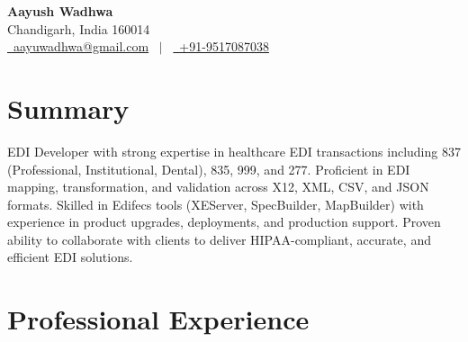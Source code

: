 \documentclass[a4paper,10pt]{article}
\begin{document}
\pagestyle{empty}

\begin{center}
    {\Huge \textbf{Aayush Wadhwa}} \\[4pt]
    Chandigarh, India 160014 \\
    \href{mailto:aayuwadhwa@gmail.com}{\faEnvelope\ aayuwadhwa@gmail.com} \, $|$ \,
    \href{tel:+919517087038}{\faMobile\ +91-9517087038} \\
\end{center}

\section{Summary}
EDI Developer with strong expertise in healthcare EDI transactions including 837 (Professional, Institutional, Dental), 835, 999, and 277. Proficient in EDI mapping, transformation, and validation across X12, XML, CSV, and JSON formats. Skilled in Edifecs tools (XEServer, SpecBuilder, MapBuilder) with experience in product upgrades, deployments, and production support. Proven ability to collaborate with clients to deliver HIPAA-compliant, accurate, and efficient EDI solutions.

\section{Professional Experience}
\end{document}
